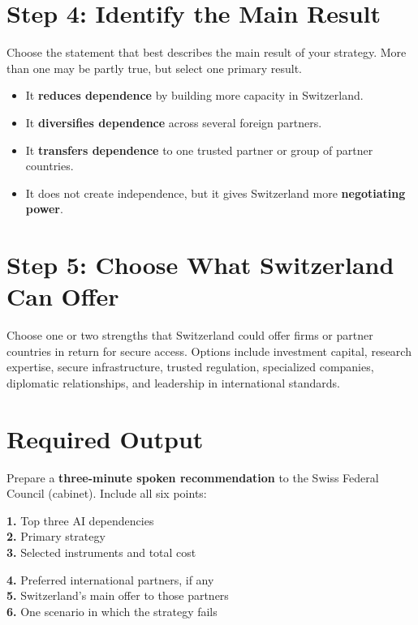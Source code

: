\documentclass[11pt]{article}
\begin{document}
\section*{Step 4: Identify the Main Result}
Choose the statement that best describes the main result of your strategy. More than one may be partly true, but select one primary result.
\begin{itemize}
  \item It \textbf{reduces dependence} by building more capacity in Switzerland.
  \item It \textbf{diversifies dependence} across several foreign partners.
  \item It \textbf{transfers dependence} to one trusted partner or group of partner countries.
  \item It does not create independence, but it gives Switzerland more \textbf{negotiating power}.
\end{itemize}

\section*{Step 5: Choose What Switzerland Can Offer}
Choose one or two strengths that Switzerland could offer firms or partner countries in return for secure access. Options include investment capital, research expertise, secure infrastructure, trusted regulation, specialized companies, diplomatic relationships, and leadership in international standards.

\section*{Required Output}
Prepare a \textbf{three-minute spoken recommendation} to the Swiss Federal Council (cabinet). Include all six points:

\begin{tcolorbox}[colback=white]
\begin{minipage}[t]{0.48\textwidth}
\textbf{1.} Top three AI dependencies\\[0.25em]
\textbf{2.} Primary strategy\\[0.25em]
\textbf{3.} Selected instruments and total cost
\end{minipage}\hfill
\begin{minipage}[t]{0.48\textwidth}
\textbf{4.} Preferred international partners, if any\\[0.25em]
\textbf{5.} Switzerland's main offer to those partners\\[0.25em]
\textbf{6.} One scenario in which the strategy fails
\end{minipage}
\end{tcolorbox}
\end{document}

